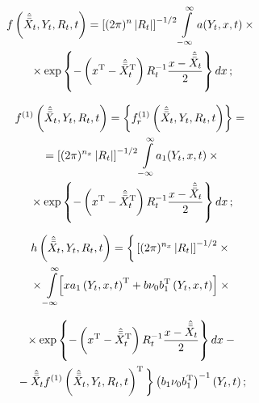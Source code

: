 \begin{multicols}{2}
\vspace*{-6pt}

\noindent
    \begin{multline}
    f\left(\hat{\bar{\bar X}}_t, Y_t,R_t,t\right)=
    \left[(2\pi)^n \left\vert
    R_t\right\vert \right]^{-1/2}\int\limits_{-\infty}^\infty a(Y_t,x,t) \times{}\\
    {}\times \exp \left\{ -\left(x^{\mathrm{T}}
    -\hat{\bar{\bar X}}_t^{\mathrm{T}}\right) R_t^{-1} \displaystyle\frac{\displaystyle x -\hat{\bar{\bar X}}_t\mathstrut}{\displaystyle 2\mathstrut}\right\}
    dx\,;\label{e3.31-sin}
    \end{multline}
    
 \vspace*{-12pt}
     
     \noindent
     \begin{multline}
     f^{(1)}\left(\hat{\bar{\bar X}}_t, Y_t,R_t,t\right)=
     \left\{
      f_r^{(1)} \left( \hat{\bar{\bar X}}_t, Y_t, R_t, t\right)\right\}={}\\
{}=\left[ (2\pi)^{n_x}\left\vert
    R_t\right\vert \right]^{-1/2}\int\limits_{-\infty}^\infty\! a_1(Y_t,x,t)\times{}\\
    {}\times \exp \left\{
    -\left(x^{\mathrm{T}} -\hat{\bar{\bar X}}_t^{\mathrm{T}}\right) R_t^{-1} \displaystyle\frac{\displaystyle x -\hat{\bar{\bar X}}_t\mathstrut}{\displaystyle 2\mathstrut}\right\}
    dx\,;\label{e3.32-sin}
    \end{multline}
     
     \vspace*{-12pt}
     
     \noindent
     \begin{multline*}
     h\left(\hat{\bar{\bar X}}_t, Y_t,R_t,t\right)=
     \bigg\{ \left[ (2\pi)^{n_x}\left\vert
         R_t\right\vert \right]^{-1/2}\times{}\\
         {}\times \int\limits_{-\infty}^\infty\!\!
    \left[ xa_1\left(Y_t,x,t\right)^{\mathrm{T}} + b\nu_0 b_1^{\mathrm{T}}\left(Y_t,x,t\right)\right]\times{}
    \end{multline*}
    
\noindent
         \begin{multline}
{}\times \exp \left\{ -\left(x^{\mathrm{T}} -\hat{\bar{\bar X}}_t^{\mathrm{T}}\right) R_t^{-1} 
\displaystyle\frac{\displaystyle x -\hat{\bar{\bar X}}_t\mathstrut}{\displaystyle 2\mathstrut}\right\} dx-{}\\[0.5pt]
{}-
    \hat{\bar{\bar X}}_t f^{(1)}\left(\hat{\bar{\bar X}}_t, Y_t,R_t,t\right)^{\mathrm{T}}\bigg\}
     \left(b_1\nu_0 b_1^{\mathrm{T}}\right)^{-1} \left(Y_t,t\right);
     \label{e3.33-sin}
\end{multline}

 \vspace*{-12pt}
     

\end{multicols}
